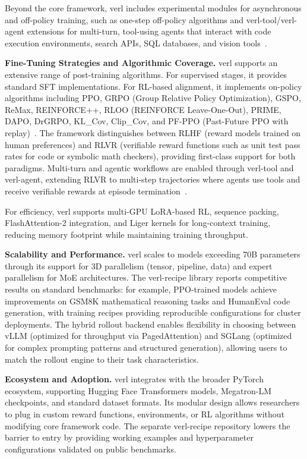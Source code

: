 \documentclass[conference]{IEEEtran}
\begin{document}
Beyond the core framework, verl includes experimental modules for asynchronous and off-policy training, such as one-step off-policy algorithms and verl-tool/verl-agent extensions for multi-turn, tool-using agents that interact with code execution environments, search APIs, SQL databases, and vision tools~\cite{verl-tool-paper}.

\textbf{Fine-Tuning Strategies and Algorithmic Coverage.} verl supports an extensive range of post-training algorithms. For supervised stages, it provides standard SFT implementations. For RL-based alignment, it implements on-policy algorithms including PPO, GRPO (Group Relative Policy Optimization), GSPO, ReMax, REINFORCE++, RLOO (REINFORCE Leave-One-Out), PRIME, DAPO, DrGRPO, KL\_Cov, Clip\_Cov, and PF-PPO (Past-Future PPO with replay)~\cite{verl-paper, verl-github}. The framework distinguishes between RLHF (reward models trained on human preferences) and RLVR (verifiable reward functions such as unit test pass rates for code or symbolic math checkers), providing first-class support for both paradigms. Multi-turn and agentic workflows are enabled through verl-tool and verl-agent, extending RLVR to multi-step trajectories where agents use tools and receive verifiable rewards at episode termination~\cite{verl-tool-paper}.

For efficiency, verl supports multi-GPU LoRA-based RL, sequence packing, FlashAttention-2 integration, and Liger kernels for long-context training, reducing memory footprint while maintaining training throughput.

\textbf{Scalability and Performance.} verl scales to models exceeding 70B parameters through its support for 3D parallelism (tensor, pipeline, data) and expert parallelism for MoE architectures. The verl-recipe library reports competitive results on standard benchmarks: for example, PPO-trained models achieve improvements on GSM8K mathematical reasoning tasks and HumanEval code generation, with training recipes providing reproducible configurations for cluster deployments. The hybrid rollout backend enables flexibility in choosing between vLLM (optimized for throughput via PagedAttention) and SGLang (optimized for complex prompting patterns and structured generation), allowing users to match the rollout engine to their task characteristics.

\textbf{Ecosystem and Adoption.} verl integrates with the broader PyTorch ecosystem, supporting Hugging Face Transformers models, Megatron-LM checkpoints, and standard dataset formats. Its modular design allows researchers to plug in custom reward functions, environments, or RL algorithms without modifying core framework code. The separate verl-recipe repository lowers the barrier to entry by providing working examples and hyperparameter configurations validated on public benchmarks.
\end{document}
